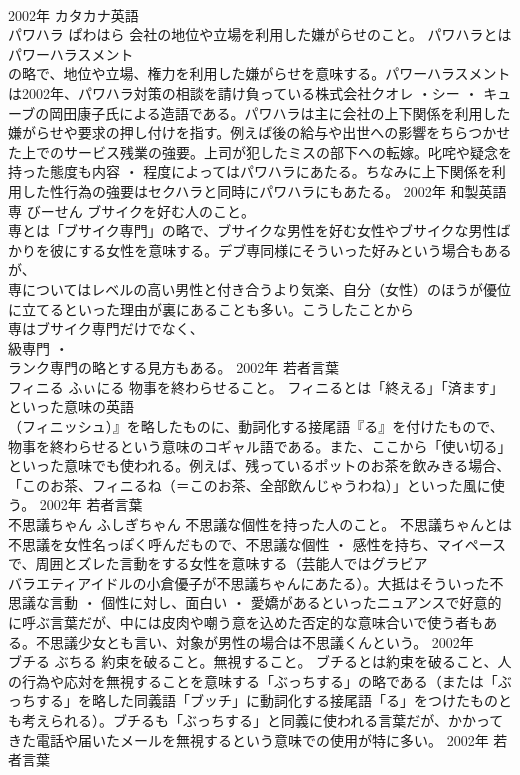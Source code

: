 \documentclass[8pt]{extreport}
\begin{document}
\begin{CJK}{UTF8}{min}
\\	2002年	カタカナ英語	
\\	パワハラ	ぱわはら	会社の地位や立場を利用した嫌がらせのこと。	パワハラとはパワーハラスメント
\\	の略で、地位や立場、権力を利用した嫌がらせを意味する。パワーハラスメントは2002年、パワハラ対策の相談を請け負っている株式会社クオレ ・シー ・ キューブの岡田康子氏による造語である。パワハラは主に会社の上下関係を利用した嫌がらせや要求の押し付けを指す。例えば後の給与や出世への影響をちらつかせた上でのサービス残業の強要。上司が犯したミスの部下への転嫁。叱咤や疑念を持った態度も内容 ・ 程度によってはパワハラにあたる。ちなみに上下関係を利用した性行為の強要はセクハラと同時にパワハラにもあたる。	2002年	和製英語	
\\	専	びーせん	ブサイクを好む人のこと。	
\\	専とは「ブサイク専門」の略で、ブサイクな男性を好む女性やブサイクな男性ばかりを彼にする女性を意味する。デブ専同様にそういった好みという場合もあるが、
\\	専についてはレベルの高い男性と付き合うより気楽、自分（女性）のほうが優位に立てるといった理由が裏にあることも多い。こうしたことから
\\	専はブサイク専門だけでなく、
\\	級専門 ・ 
\\	ランク専門の略とする見方もある。	2002年	若者言葉	
\\	フィニる	ふぃにる	物事を終わらせること。	フィニるとは「終える」「済ます」といった意味の英語
\\	（フィニッシュ）』を略したものに、動詞化する接尾語『る』を付けたもので、物事を終わらせるという意味のコギャル語である。また、ここから「使い切る」といった意味でも使われる。例えば、残っているポットのお茶を飲みきる場合、「このお茶、フィニるね（＝このお茶、全部飲んじゃうわね）」といった風に使う。	2002年	若者言葉	
\\	不思議ちゃん	ふしぎちゃん	不思議な個性を持った人のこと。	不思議ちゃんとは不思議を女性名っぽく呼んだもので、不思議な個性 ・ 感性を持ち、マイペースで、周囲とズレた言動をする女性を意味する（芸能人ではグラビア
\\	バラエティアイドルの小倉優子が不思議ちゃんにあたる）。大抵はそういった不思議な言動 ・ 個性に対し、面白い ・ 愛嬌があるといったニュアンスで好意的に呼ぶ言葉だが、中には皮肉や嘲う意を込めた否定的な意味合いで使う者もある。不思議少女とも言い、対象が男性の場合は不思議くんという。	2002年	
\\	ブチる	ぶちる	約束を破ること。無視すること。	ブチるとは約束を破ること、人の行為や応対を無視することを意味する「ぶっちする」の略である（または「ぶっちする」を略した同義語「ブッチ」に動詞化する接尾語「る」をつけたものとも考えられる）。ブチるも「ぶっちする」と同義に使われる言葉だが、かかってきた電話や届いたメールを無視するという意味での使用が特に多い。	2002年	若者言葉	

\end{CJK}
\end{document}
